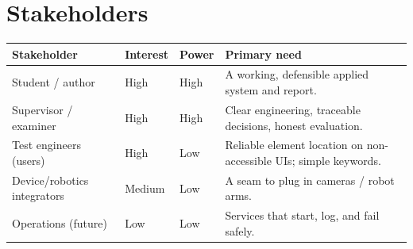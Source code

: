 \documentclass[11pt,a4paper]{report}
\begin{document}
\section{Stakeholders}
\begin{longtable}{@{}p{3.4cm}p{2.2cm}p{2.0cm}p{6.0cm}@{}}
\toprule
\textbf{Stakeholder} & \textbf{Interest} & \textbf{Power} & \textbf{Primary need} \\
\midrule
\endhead
Student / author & High & High & A working, defensible applied system and report. \\
Supervisor / examiner & High & High & Clear engineering, traceable decisions, honest evaluation. \\
Test engineers (users) & High & Low & Reliable element location on non-accessible UIs; simple keywords. \\
Device/robotics integrators & Medium & Low & A seam to plug in cameras / robot arms. \\
Operations (future) & Low & Low & Services that start, log, and fail safely. \\
\bottomrule
\end{longtable}

\end{document}
